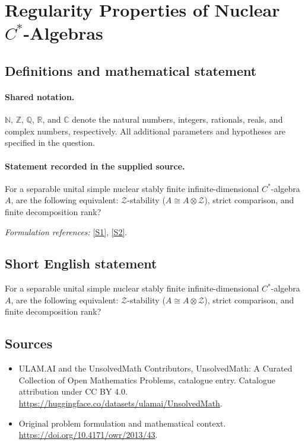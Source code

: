 \documentclass[11pt]{article}
\newcommand{\sref}[2]{\hyperlink{source:#1:#2}{[S#2]}}
\begin{document}
\section{\texorpdfstring{Regularity Properties of Nuclear $C^*$-Algebras}{Regularity Properties of Nuclear C\textasciicircum{}*-Algebras}}\label{statement}

\subsection{Definitions and mathematical statement}

\paragraph{Shared notation.}$\mathbb N$, $\mathbb Z$, $\mathbb Q$, $\mathbb R$, and $\mathbb C$ denote the natural numbers, integers, rationals, reals, and complex numbers, respectively. All additional parameters and hypotheses are specified in the question.


\paragraph{Statement recorded in the supplied source.}
For a separable unital simple nuclear stably finite infinite-dimensional $C^*$-algebra $A$, are the following equivalent: $\mathcal Z$-stability ($A\cong A\otimes\mathcal Z$), strict comparison, and finite decomposition rank?
\par\smallskip\textit{Formulation references:} \sref{statement}{1}, \sref{statement}{2}.
\subsection{Short English statement}
For a separable unital simple nuclear stably finite infinite-dimensional $C^*$-algebra $A$, are the following equivalent: $\mathcal Z$-stability ($A\cong A\otimes\mathcal Z$), strict comparison, and finite decomposition rank?
\subsection{Sources}
\begin{itemize}
\item[\hypertarget{source:statement:1}{S1}] ULAM.AI and the UnsolvedMath Contributors, UnsolvedMath: A Curated Collection of Open Mathematics Problems, catalogue entry. Catalogue attribution under CC BY 4.0.
\url{https://huggingface.co/datasets/ulamai/UnsolvedMath}.
\item[\hypertarget{source:statement:2}{S2}] Original problem formulation and mathematical context.
\url{https://doi.org/10.4171/owr/2013/43}.
\end{itemize}
\label{end:statement}
\end{document}
